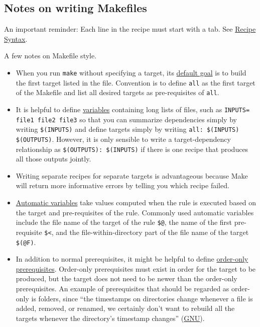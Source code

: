 \subsection{Notes on writing Makefiles}

An important reminder: Each line in the recipe must start with a tab.
See \href{https://www.gnu.org/software/make/manual/html_node/Recipe-Syntax.html}{Recipe Syntax}.

A few notes on Makefile style.
\begin{itemize}
\item
When you run \texttt{make} without specifying a target,
its \href{https://www.gnu.org/software/make/manual/html_node/How-Make-Works.html#How-Make-Works}{default goal}
is to build the first target listed in the file.
Convention is to define \texttt{all} as the first target of the Makefile and list all desired targets as pre-requisites of \texttt{all}. 
\item It is helpful to define \href{https://www.gnu.org/software/make/manual/html_node/Variables-Simplify.html#Variables-Simplify}{variables} containing long lists of files, such as \texttt{INPUTS= file1 file2 file3}
so that you can summarize dependencies simply by writing \texttt{\$(INPUTS)}
and define targets simply by writing \texttt{all: \$(INPUTS) \$(OUTPUTS)}.
However, it is only sensible to write a target-dependency relationship as
\texttt{\$(OUTPUTS): \$(INPUTS)}
if there is one recipe that produces all those outputs jointly.
\item Writing separate recipes for separate targets is advantageous because Make will return more informative errors by telling you which recipe failed.
\item \href{https://www.gnu.org/software/make/manual/html_node/Automatic-Variables.html}{Automatic variables} take values computed when the rule is executed based on the target and pre-requisites of the rule.
Commonly used automatic variables include
the file name of the target of the rule \texttt{\$@},
the name of the first pre-requisite \texttt{\$<},
and
the file-within-directory part of the file name of the target \texttt{\$(@F)}.
\item In addition to normal prerequisites, it might be helpful to define \href{https://www.gnu.org/software/make/manual/html_node/Prerequisite-Types.html}{order-only prerequisites}.
Order-only prerequisites must exist in order for the target to be produced, but the target does not need to be newer than the order-only prerequisites.
An example of prerequisites that should be regarded as order-only is folders, since ``the timestamps on directories change whenever a file is added, removed, or renamed, we certainly don’t want to rebuild all the targets whenever the directory’s timestamp changes'' (\href{https://www.gnu.org/software/make/manual/html_node/Prerequisite-Types.html}{GNU}). 

\end{itemize}
